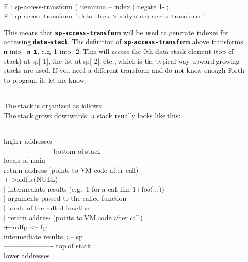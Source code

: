 \documentclass[10pt,english]{article}
\begin{document}
\nwenddocs{}\endmoddef
\\E : sp-access-transform ( itemnum -- index ) negate 1- ;
\\E ' sp-access-transform ' data-stack >body stack-access-transform !
\nwendcode{}\nwdocspar

This means that \texttt{\textbf{sp-access-transform}} will be used
to generate indexes for accessing \texttt{\textbf{data-stack}}. The
definition of \texttt{\textbf{sp-access-transform}} above transforms
\texttt{\textbf{n}} into \texttt{\textbf{-n-1}}, e.g, 1 into -2. This
will access the 0th data-stack element (top-of-stack) at sp{[}-1{]},
the 1st at sp{[}-2{]}, etc., which is the typical way upward-growing
stacks are used. If you need a different transform and do not know
enough Forth to program it, let me know.

\nwenddocs{}\endmoddef
\\  The stack is organized as follows:
\\  The stack grows downwards; a stack usually looks like this:

\\  higher addresses
\\  --------------------- bottom of stack
\\     locals of main
\\     return address (points to VM code after call)
\\  +->oldfp (NULL)
\\  |  intermediate results (e.g., 1 for a call like 1+foo(...))
\\  |  arguments passed to the called function
\\  |  locals of the called function
\\  |  return address (points to VM code after call)
\\  +--oldfp                <-- fp
\\     intermediate results <-- sp
\\  ---------------------- top of stack
\\  lower addresses
\nwendcode{}\nwdocspar
\end{document}
